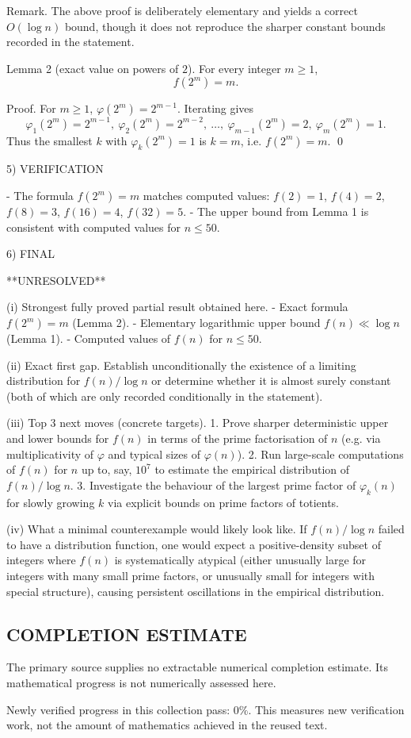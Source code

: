 Remark.
The above proof is deliberately elementary and yields a correct $O(\log n)$ bound, though it does not reproduce the sharper constant bounds recorded in the statement.

Lemma 2 (exact value on powers of $2$).
For every integer $m\ge 1$,
\[
 f(2^m)=m.
\]

Proof.
For $m\ge 1$, $\varphi(2^m)=2^{m-1}$.
Iterating gives
\[
\varphi_1(2^m)=2^{m-1},\ \varphi_2(2^m)=2^{m-2},\ \dots,\ \varphi_{m-1}(2^m)=2,\ \varphi_m(2^m)=1.
\]
Thus the smallest $k$ with $\varphi_k(2^m)=1$ is $k=m$, i.e. $f(2^m)=m$. \qed

5) VERIFICATION

- The formula $f(2^m)=m$ matches computed values: $f(2)=1$, $f(4)=2$, $f(8)=3$, $f(16)=4$, $f(32)=5$.
- The upper bound from Lemma 1 is consistent with computed values for $n\le 50$.

6) FINAL

**UNRESOLVED**

(i) Strongest fully proved partial result obtained here.
- Exact formula $f(2^m)=m$ (Lemma 2).
- Elementary logarithmic upper bound $f(n)\ll \log n$ (Lemma 1).
- Computed values of $f(n)$ for $n\le 50$.

(ii) Exact first gap.
Establish unconditionally the existence of a limiting distribution for $f(n)/\log n$ or determine whether it is almost surely constant (both of which are only recorded conditionally in the statement).

(iii) Top 3 next moves (concrete targets).
1. Prove sharper deterministic upper and lower bounds for $f(n)$ in terms of the prime factorisation of $n$ (e.g. via multiplicativity of $\varphi$ and typical sizes of $\varphi(n)$).
2. Run large-scale computations of $f(n)$ for $n$ up to, say, $10^7$ to estimate the empirical distribution of $f(n)/\log n$.
3. Investigate the behaviour of the largest prime factor of $\varphi_k(n)$ for slowly growing $k$ via explicit bounds on prime factors of totients.

(iv) What a minimal counterexample would likely look like.
If $f(n)/\log n$ failed to have a distribution function, one would expect a positive-density subset of integers where $f(n)$ is systematically atypical (either unusually large for integers with many small prime factors, or unusually small for integers with special structure), causing persistent oscillations in the empirical distribution.




\subsection*{COMPLETION ESTIMATE}
The primary source supplies no extractable numerical completion estimate. Its mathematical progress is not numerically assessed here.

Newly verified progress in this collection pass: $0\%$. This measures new verification work, not the amount of mathematics achieved in the reused text.
